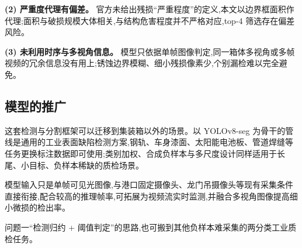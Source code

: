 \textbf{(2) 严重度代理有偏差。} 官方未给出残损“严重程度”的定义,本文以边界框面积作代理;面积与破损规模大体相关,与结构危害程度并不严格对应,top-4 筛选存在偏差风险。

\textbf{(3) 未利用时序与多视角信息。} 模型只依据单帧图像判定,同一箱体多视角或多帧视频的冗余信息没有用上;锈蚀边界模糊、细小残损像素少,个别漏检难以完全避免。

\subsection{模型的推广}

这套检测与分割框架可以迁移到集装箱以外的场景。以 YOLOv8-seg 为骨干的管线是通用的工业表面缺陷检测方案,钢轨、车身漆面、太阳能电池板、管道焊缝等任务更换标注数据即可使用;类别加权、合成负样本与多尺度设计同样适用于长尾、小目标、负样本稀缺的质检场景。

模型输入只是单帧可见光图像,与港口固定摄像头、龙门吊摄像头等现有采集条件直接衔接,配合较高的推理帧率,可拓展为视频流实时监测,并融合多视角图像提高细小微损的检出率。

问题一“检测归约 + 阈值判定”的思路,也可搬到其他负样本难采集的两分类工业质检任务。
